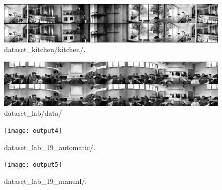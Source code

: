 \documentclass{article}
\begin{document}
\begin{figure}[h]
\begin{center}
\includegraphics[width=170mm]{output2} 
\caption{\footnotesize{dataset\_kitchen/kitchen/.}}
\end{center} 
\end{figure}
\begin{figure}[h]
\begin{center}
\includegraphics[width=170mm]{output3} 
\caption{\footnotesize{dataset\_lab/data/}}
\end{center} 
\end{figure}
\begin{figure}[H]
\begin{center}
\texttt{[image: output4]} 
\caption{\footnotesize{dataset\_lab\_19\_automatic/.}}
\vspace{4mm}
\texttt{[image: output5]} 
\caption{\footnotesize{dataset\_lab\_19\_manual/.}}
\end{center} 
\end{figure}
\end{document}
